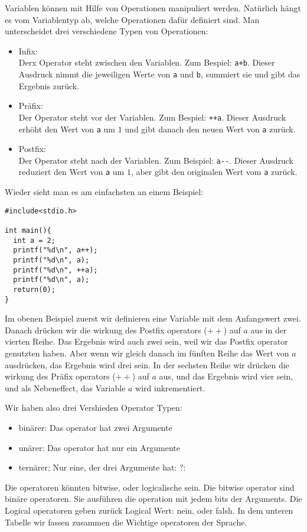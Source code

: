 Variablen können mit Hilfe von Operationen manipuliert werden.
Natürlich hängt es vom Variablentyp ab, welche Operationen dafür definiert sind.
Man unterscheidet drei verschiedene Typen von Operationen:
\begin{itemize}
\item Infix:\\
  Derx Operator steht zwischen den Variablen. Zum Bespiel: \verb|a+b|. 
  Dieser Ausdruck nimmt die jeweiligen Werte von \verb|a| und \verb|b|, summiert sie und gibt das Ergebnis zurück.
\item Präfix:\\
  Der Operator steht vor der Variablen. Zum Bespiel: \verb|++a|. 
  Dieser Ausdruck erhöht den Wert von \verb|a| um $1$ und gibt danach den neuen Wert von \verb|a| zurück.
\item Postfix:\\
  Der Operator steht nach der Variablen. Zum Beispiel: \verb|a--|. 
  Dieser Ausdruck reduziert den Wert von \verb|a| um $1$, aber gibt den originalen Wert vom \verb|a| zurück.
\end{itemize}
Wieder sieht man es am einfachsten an einem Beispiel:
\begin{lstlisting}
#include<stdio.h>

int main(){
  int a = 2;
  printf("%d\n", a++);
  printf("%d\n", a);
  printf("%d\n", ++a);
  printf("%d\n", a);
  return(0);  
}
\end{lstlisting}
Im obenen Beispiel zuerst wir definieren eine Variable mit dem Anfangswert zwei. Danach drücken wir die wirkung des Postfix operators ($++$) auf $a$ aus 
in der vierten Reihe. Das Ergebnis wird auch zwei sein, weil wir das Postfix operator genutzten haben. Aber wenn wir gleich danach im fünften Reihe
das Wert von $a$ ausdrücken, das Ergebnis wird drei sein. In der sechsten Reihe wir drücken die wirkung des Präfix operators ($++$) auf $a$ aus, und 
das Ergebnis wird vier sein, und als Nebeneffect, das Variable $a$ wird inkrementiert.

Wir haben also drei Vershieden Operator Typen:
\begin{itemize}
\item binärer: Das operator hat zwei Argumente
\item unärer: Das operator hat nur ein Argumente
\item ternärer; Nur eine, der drei Argumente hat: $?:$
\end{itemize} 

Die operatoren könnten bitwise, oder logicalische sein. Die bitwise operator sind binäre operatoren. Sie ausführen die operation mit jedem bits der Arguments.
Die Logical operatoren geben zurück Logical Wert: nein, oder falsh. In dem unteren Tabelle wir fassen zusammen die Wichtige operatoren der Sprache.

